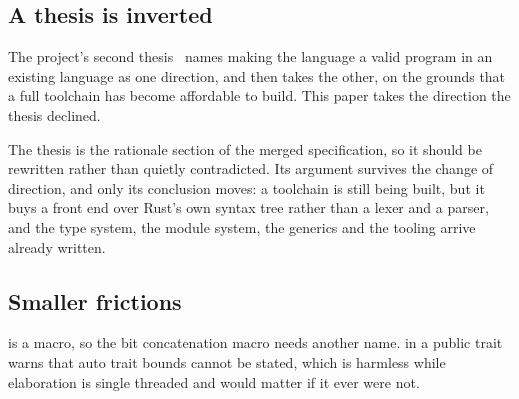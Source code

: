 \subsection{A thesis is inverted}

The project's second thesis~\cite{theses} names making the language a valid
program in an existing language as one direction, and then takes the other,
on the grounds that a full toolchain has become affordable to build. This
paper takes the direction the thesis declined.

The thesis is the rationale section of the merged specification, so it
should be rewritten rather than quietly contradicted. Its argument survives
the change of direction, and only its conclusion moves: a toolchain is
still being built, but it buys a front end over Rust's own syntax tree
rather than a lexer and a parser, and the type system, the module system,
the generics and the tooling arrive already written.

\subsection{Smaller frictions}

 is a  macro, so the bit concatenation macro needs
another name.  in a public trait warns that auto trait
bounds cannot be stated, which is harmless while elaboration is single
threaded and would matter if it ever were not.
